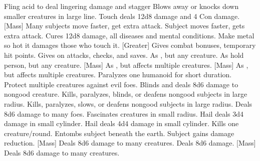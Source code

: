     {Fling acid to deal lingering damage and stagger}
    {Blows away or knocks down smaller creatures in large line.}
    {Touch deals 12d8 damage and 4 Con damage.}
[Mass]
    {Many subjects move faster, get extra attack.}
    {Subject moves faster, gets extra attack.}
    {Cures 12d8 damage, all diseases and mental conditions.}
    {Make metal so hot it damages those who touch it.}
[Greater]
    {Gives combat bonuses, temporary hit points.}
    {Gives  on attacks, checks, and saves.}
    {As , but any creature.}
    {As hold person, but any creature.}
    {[Mass] As , but affects multiple creatures.}
[Mass]
    {As , but affects multiple creatures.}
    {Paralyzes one humanoid for short duration.}
    {Protect multiple creatures against evil foes. }
    {Blinds and deals 8d6 damage to nongood creature.}
    {Kills, paralyzes, blinds, or deafens nongood subjects in large radius.}
    {Kills, paralyzes, slows, or deafens nongood subjects in large radius.}
    {Deals 8d6 damage to many foes.}
    {Fascinates creatures in small radius.}
    {Hail deals 3d4 damage in small cylinder.}
    {Hail deals 4d4 damage in small cylinder.}
    {Kills one creature/round.}
    {Entombs subject beneath the earth.}
    {Subject gains damage reduction.}
[Mass]
    {Deals 8d6 damage to many creatures.}
    {Deals 8d6 damage.}
    {[Mass] Deals 8d6 damage to many creatures.}
